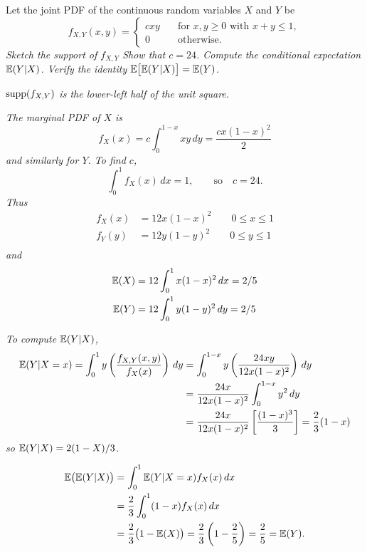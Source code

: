 \begin{example}
Let the joint PDF of the continuous random variables $X$ and $Y$ be 
\[
f_{X,Y}(x,y) = \begin{cases}
	cxy & \quad\text{for $x,y\geq 0$ with $x+y\leq 1$}, \\
	0	& \quad\text{otherwise.}
\end{cases}
\]
\ben
\it Sketch the support of $f_{X,Y}$
\it Show that $c=24$.
\it Compute the conditional expectation $\mathbb{E}(Y|X)$.
\it Verify the identity $\mathbb{E}\big[\mathbb{E}(Y|X)\big]=\mathbb{E}(Y)$.
\een 

\begin{solution}
\ben

\it %
$\text{supp}(f_{X,Y})$ is the lower-left half of the unit square.

\it %
The marginal PDF of $X$ is
\[
f_X(x) = c\int_{0}^{1-x} xy\,dy = \frac{cx(1-x)^2}{2}
\]
and similarly for $Y$. To find $c$,
\[
\int_{0}^{1} f_X(x)\,dx = 1, \qquad\text{so}\quad c=24.
\]
Thus
\begin{align*}
f_X(x)	& = 12x(1-x)^2 \qquad 0\leq x\leq 1 \\
f_Y(y)	& = 12y(1-y)^2 \qquad 0\leq y\leq 1 \\
\end{align*}
and
\begin{align*}
\mathbb{E}(X) & = 12\int_0^1 x(1-x)^2\,dx = 2/5 \\
\mathbb{E}(Y) & = 12\int_0^1 y(1-y)^2\,dy = 2/5 \\
\end{align*}

\it %
To compute $\mathbb{E}(Y|X)$,
\begin{align*}
\mathbb{E}(Y|X=x)
	= \int_0^1 y\left(\frac{f_{X,Y}(x,y)}{f_X(x)}\right)\,dy
	& = \int_0^{1-x} y\left(\frac{24xy}{12x(1-x)^2}\right)\,dy \\
	& = \frac{24x}{12x(1-x)^2}\int_0^{1-x} y^2\,dy \\
	& =  \frac{24x}{12x(1-x)^2}\left[\frac{(1-x)^3}{3}\right]
	= \frac{2}{3}(1-x)	
\end{align*}
so $\mathbb{E}(Y|X) = 2(1-X)/3$.

\it %
\begin{align*}
\mathbb{E}\big(\mathbb{E}(Y|X)\big)
	& = \int_0^1 \mathbb{E}(Y|X=x) f_X(x)\,dx \\
	& = \frac{2}{3}\int_0^1 (1-x) f_X(x)\,dx \\
	& = \frac{2}{3}\big(1-\mathbb{E}(X)\big) = \frac{2}{3}\left(1-\frac{2}{5}\right) = \frac{2}{5}
	= \mathbb{E}(Y).
\end{align*}
\een
\mbox{}
\end{solution}
\end{example}

